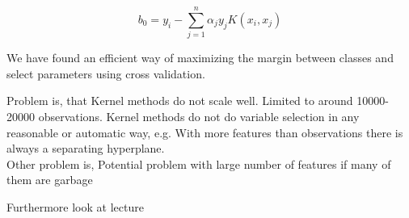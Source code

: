 \[
    b_0 = y_i - \sum_{j=1}^{n} \alpha_j y_j K(x_i, x_j)
\]

We have found an efficient way of maximizing the margin
between classes and select parameters using cross validation. \cite[p.~40,43]{lecture5}

Problem is, that Kernel methods do not scale well. Limited to around 10000-20000 observations. Kernel methods do not do variable selection in any reasonable or
automatic way, e.g. With more features than observations there is always a separating hyperplane.\\

Other problem is, Potential problem with large number of features if many of them are garbage







Furthermore look at lecture \cite[p.~3-6]{lecture6}